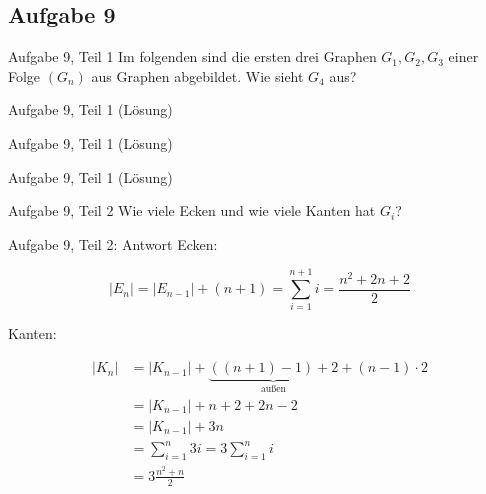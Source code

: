 \subsection{Aufgabe 9}
\begin{frame}{Aufgabe 9, Teil 1}
Im folgenden sind die ersten drei Graphen $G_1, G_2, G_3$ einer
Folge $(G_n)$ aus Graphen abgebildet. Wie sieht $G_4$ aus?

\begin{gallery}
\end{gallery}
\end{frame}

\begin{frame}{Aufgabe 9, Teil 1 (Lösung)}
    \begin{center}
        
    \end{center}
\end{frame}

\begin{frame}{Aufgabe 9, Teil 1 (Lösung)}
    \begin{center}
        
    \end{center}
\end{frame}

\begin{frame}{Aufgabe 9, Teil 1 (Lösung)}
    \begin{center}
        
    \end{center}
\end{frame}

\begin{frame}{Aufgabe 9, Teil 2}
Wie viele Ecken und wie viele Kanten hat $G_i$?

\begin{gallery}
\end{gallery}
\end{frame}

\begin{frame}{Aufgabe 9, Teil 2: Antwort}
Ecken:

\[|E_n| = |E_{n-1}| + (n+1) = \sum_{i=1}^{n+1} i = \frac{n^2 + 2n+2}{2}\]

Kanten:

\begin{align}
|K_n| &= |K_{n-1}| + \underbrace{((n+1)-1)+2}_{\text{außen}} + (n-1) \cdot 2\\
    &= |K_{n-1}| + n+2+2n-2\\
    &= |K_{n-1}| + 3n\\
    &= \sum_{i=1}^{n} 3i = 3 \sum_{i=1}^{n} i \\
    &= 3 \frac{n^2 + n}{2}
\end{align}
\end{frame}


